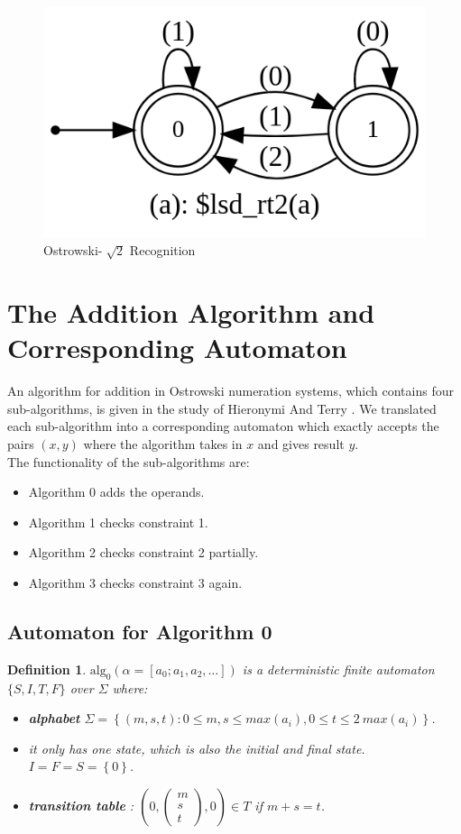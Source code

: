 \documentclass[a4paper]{article}
\newtheorem{definition}{Definition}
\begin{document}
\begin{figure}[h]
	\centering
    \includegraphics[width=0.4\columnwidth]{lsd_rt2.png}
    \caption{Ostrowski-$\sqrt[~]{2}$ Recognition}
    \label{fig:lsd_rt2}
\end{figure}


\section{The Addition Algorithm and Corresponding Automaton}


An algorithm for addition in Ostrowski numeration systems, which contains four sub-algorithms, is given in the study of Hieronymi And Terry \cite{htostrowski}. We translated each sub-algorithm into a corresponding automaton which exactly accepts the pairs $(x,y)$ where the algorithm takes in $x$ and gives result $y$.
\\The functionality of the sub-algorithms are:
\begin{itemize}
\item Algorithm 0 adds the operands.
\item Algorithm 1 checks constraint 1.
\item Algorithm 2 checks constraint 2 partially.
\item Algorithm 3 checks constraint 3 again.
\end{itemize}

\subsection{Automaton for Algorithm 0}
    \begin{definition}
    $\text{alg}_0(\alpha = [a_0; a_1,a_2,\dots])$ is a deterministic finite automaton $\{S,I,T,F\}$ over $\Sigma$ where:
    \begin{itemize}
    \item \textbf{alphabet} $\Sigma = \left\{(m,s,t) : 0\le m,s \le max(a_i),0\le t \le 2 ~max(a_i) \right\}$.
   \item it only has one state, which is also the initial and final state. $I = F = S = \left\{0\right\}$. 
   \item \textbf{transition table} :  $\left(0, \begin{pmatrix}m\\s\\t\end{pmatrix},0\right) \in T$ if $m+s=t$.
   \end{itemize}
\end{definition}
\end{document}
